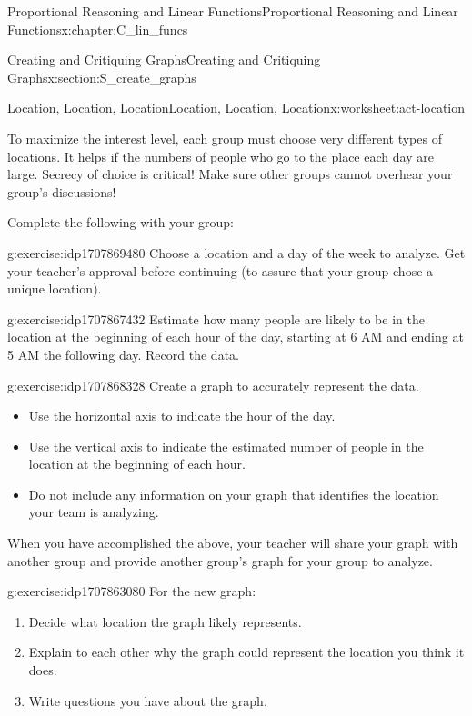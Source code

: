 \documentclass[oneside,10pt,]{book}
\numberwithin{equation}{chapter}
\begin{document}
\begin{chapterptx}{Proportional Reasoning and Linear Functions}{}{Proportional Reasoning and Linear Functions}{}{}{x:chapter:C_lin_funcs}
\begin{sectionptx}{Creating and Critiquing Graphs}{}{Creating and Critiquing Graphs}{}{}{x:section:S_create_graphs}
\begin{worksheet-subsection}{Location, Location, Location}{}{Location, Location, Location}{}{}{x:worksheet:act-location}
\begin{introduction}{}
To maximize the interest level, each group must choose very different types of locations. It helps if the numbers of people who go to the place each day are large. Secrecy of choice is critical! Make sure other groups cannot overhear your group's discussions!%
\par
Complete the following with your group:%
\end{introduction}%
\begin{divisionexercise}{1}{}{}{g:exercise:idp1707869480}%
Choose a location and a day of the week to analyze. Get your teacher's approval before continuing (to assure that your group chose a unique location).%
\end{divisionexercise}%
\begin{divisionexercise}{2}{}{}{g:exercise:idp1707867432}%
Estimate how many people are likely to be in the location at the beginning of each hour of the day, starting at 6 AM and ending at 5 AM the following day. Record the data.%
\end{divisionexercise}%
\begin{divisionexercise}{3}{}{}{g:exercise:idp1707868328}%
Create a graph to accurately represent the data.%
\begin{itemize}[label=\textbullet]
\item{}Use the horizontal axis to indicate the hour of the day.%
\item{}Use the vertical axis to indicate the estimated number of people in the location at the beginning of each hour.%
\item{}Do not include any information on your graph that identifies the location your team is analyzing.%
\end{itemize}
%
\par
When you have accomplished the above, your teacher will share your graph with another group and provide another group's graph for your group to analyze.%
\end{divisionexercise}%
\begin{divisionexercise}{4}{}{}{g:exercise:idp1707863080}%
For the new graph:%
\begin{enumerate}[font=\bfseries,label=(\alph*),ref=\alph*]
\item{}Decide what location the graph likely represents.%
\item{}Explain to each other why the graph could represent the location you think it does.%
\item{}Write questions you have about the graph.%
\end{enumerate}

\end{divisionexercise}
\end{worksheet-subsection}
\end{sectionptx}
\end{chapterptx}
\end{document}
